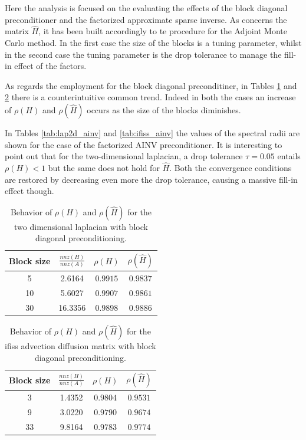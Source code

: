 Here the analysis is focused on the evaluating the effects of the
block diagonal preconditioner and the factorized approximate sparse inverse.
As concerns the matrix $\hat{H}$, it has been built accordingly to te
procedure for the Adjoint Monte Carlo method. In
the first case the size of the blocks is a tuning parameter, whilst in the
second case the tuning parameter is the drop tolerance to manage the fill-in
effect of the factors.

As regards the employment for the block diagonal preconditiner, in Tables
\ref{tab:lap2d_block} and \ref{tab:ifiss_block} there is a counterintuitive
common trend. Indeed in both the cases an increase of $\rho(H)$ and
$\rho(\hat{H})$  occurs as the size of the blocks diminishes.

In Tables \ref{tab:lap2d_ainv} and \ref{tab:ifiss_ainv} the values of
the spectral radii are shown for the case of the factorized AINV
preconditioner. It is interesting to point out that for the
two-dimensional
laplacian, a drop tolerance $\tau=0.05$ entails $\rho(H)<1$ but the same does
not hold for $\hat{H}$. Both the convergence conditions are restored by
decreasing even more the drop tolerance, causing a massive fill-in effect
though.


\begin{table}[!h]
\centering
\begin{tabular}{|c|c|c|c|}
\hline
\textbf{Block size} & \textbf{$\frac{nnz(H)}{nnz(A)}$}& $\rho(H)$
&$\rho(\hat{H})$\\
\hline
 5 & 2.6164 & $0.9915$ & $0.9837$\\
\hline
 10 & 5.6027 & $0.9907$ & $0.9861$\\
\hline
 30 & 16.3356 & $0.9898$  & $0.9886$\\
\hline
\end{tabular}
\caption{Behavior of $\rho(H)$ and $\rho(\hat{H})$ for the two dimensional
laplacian with block diagonal preconditioning.}
\label{tab:lap2d_block}
\end{table}


\begin{table}[!h]
\centering
\begin{tabular}{|c|c|c|c|}
\hline
\textbf{Block size} & \textbf{$\frac{nnz(H)}{nnz(A)}$}& $\rho(H)$
&$\rho(\hat{H})$\\
\hline
 3 & 1.4352 & $0.9804$ & $0.9531$\\
\hline
 9 & 3.0220 & $0.9790$ & $0.9674$\\
\hline
 33 & 9.8164 & $0.9783$  & $0.9774$\\
\hline
\end{tabular}
\caption{Behavior of $\rho(H)$ and $\rho(\hat{H})$ for the ifiss advection
diffusion matrix with block diagonal preconditioning.}
\label{tab:ifiss_block}
\end{table}


